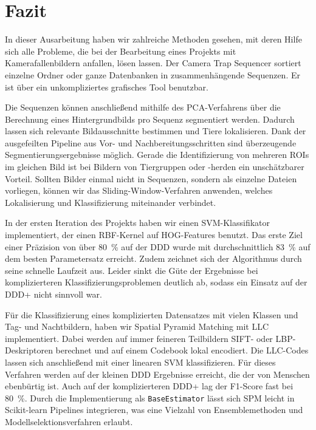 \section{Fazit}
\label{sec:fazit}

In dieser Ausarbeitung haben wir zahlreiche Methoden gesehen, mit deren Hilfe sich alle Probleme, die bei der Bearbeitung eines Projekts mit Kamerafallenbildern anfallen, lösen lassen. Der Camera Trap Sequencer sortiert einzelne Ordner oder ganze Datenbanken in zusammenhängende Sequenzen. Er ist über ein unkompliziertes grafisches Tool benutzbar.

Die Sequenzen können anschließend mithilfe des PCA-Verfahrens über die Berechnung eines Hintergrundbilds pro Sequenz segmentiert werden. Dadurch lassen sich relevante Bildausschnitte bestimmen und Tiere lokalisieren. Dank der ausgefeilten Pipeline aus Vor- und Nachbereitungsschritten sind überzeugende Segmentierungsergebnisse möglich. Gerade die Identifizierung von mehreren ROIs im gleichen Bild ist bei Bildern von Tiergruppen oder -herden ein unschätzbarer Vorteil. Sollten Bilder einmal nicht in Sequenzen, sondern als einzelne Dateien vorliegen, können wir das Sliding-Window-Verfahren anwenden, welches Lokalisierung und Klassifizierung miteinander verbindet.

In der ersten Iteration des Projekts haben wir einen SVM-Klassifikator implementiert, der einen RBF-Kernel auf HOG-Features benutzt. Das erste Ziel einer Präzision von über 80~\% auf der DDD wurde mit durchschnittlich 83~\% auf dem besten Parametersatz erreicht. Zudem zeichnet sich der Algorithmus durch seine schnelle Laufzeit aus. Leider sinkt die Güte der Ergebnisse bei komplizierteren Klassifizierungsproblemen deutlich ab, sodass ein Einsatz auf der DDD+ nicht sinnvoll war.

Für die Klassifizierung eines komplizierten Datensatzes mit vielen Klassen und Tag- und Nachtbildern, haben wir Spatial Pyramid Matching mit LLC implementiert. Dabei werden auf immer feineren Teilbildern SIFT- oder LBP-Deskriptoren berechnet und auf einem Codebook lokal encodiert. Die LLC-Codes lassen sich anschließend mit einer linearen SVM klassifizieren. Für dieses Verfahren werden auf der kleinen DDD Ergebnisse erreicht, die der von Menschen ebenbürtig ist. Auch auf der komplizierteren DDD+ lag der F1-Score fast bei 80~\%. Durch die Implementierung als \texttt{BaseEstimator} lässt sich SPM leicht in Scikit-learn Pipelines integrieren, was eine Vielzahl von Ensemblemethoden und Modellselektionsverfahren erlaubt.

